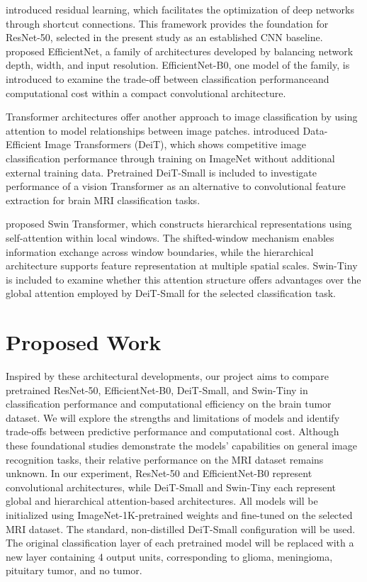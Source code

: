 \documentclass[11pt,letterpaper]{article}
\begin{document}
\citet{he2016} introduced residual learning,
which facilitates the optimization of deep networks through shortcut connections. This framework provides the foundation for ResNet-50,
selected in the present study as an established CNN baseline. \citet{tan2019} proposed EfficientNet, a family of architectures developed by
balancing network depth, width, and input resolution. EfficientNet-B0, one model of the family, is introduced to examine the trade-off between 
classification performanceand computational cost within a compact convolutional architecture.

Transformer architectures offer another approach to image classification by using attention to model relationships between image patches.
\citet{touvron2021} introduced Data-Efficient Image Transformers (DeiT), which shows competitive image classification performance through
training on ImageNet without additional external training data. Pretrained DeiT-Small is included to investigate performance of a vision
Transformer as an alternative to convolutional feature extraction for brain MRI classification tasks.

\citet{liu2021} proposed Swin Transformer, which constructs hierarchical representations using self-attention within local windows.
The shifted-window mechanism enables information exchange across window boundaries, while the hierarchical architecture supports feature
representation at multiple spatial scales. Swin-Tiny is included to examine whether this attention structure offers advantages over the global
attention employed by DeiT-Small for the selected classification task.

\section*{Proposed Work}
\setlength{\emergencystretch}{2em}
Inspired by these architectural developments, our project aims to compare pretrained ResNet-50, \mbox{EfficientNet-B0}, DeiT-Small, and Swin-Tiny
in classification performance and computational efficiency on the brain tumor dataset. We will explore the strengths and limitations of
models and identify trade-offs between predictive performance and computational cost. Although these foundational studies demonstrate
the models' capabilities on general image recognition tasks, their relative performance on the MRI dataset remains unknown. In our
experiment, ResNet-50 and EfficientNet-B0 represent convolutional architectures, while DeiT-Small and Swin-Tiny each represent global and
hierarchical attention-based architectures. All models will be initialized using ImageNet-1K-pretrained weights and fine-tuned on the
selected MRI dataset. The standard, non-distilled DeiT-Small configuration will be used. The original classification layer of each pretrained
model will be replaced with a new layer containing 4 output units, corresponding to glioma, meningioma, pituitary tumor, and no tumor.
\end{document}
